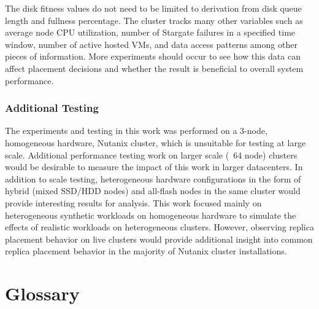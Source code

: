 \documentclass[12pt]{article}
\begin{document}
    The disk fitness values do not need to be limited to derivation from disk
    queue length and fullness percentage. The cluster tracks many other variables
    such as average node CPU utilization, number of Stargate failures in a
    specified time window, number of active hosted VMs, and data access patterns
    among other pieces of information. More experiments should occur to see how
    this data can affect placement decisions and whether the result is
    beneficial to overall system performance.
    
    \subsubsection{Additional Testing}

    The experiments and testing in this work was performed on a 3-node,
    homogeneous hardware, Nutanix cluster, which is unsuitable for testing at
    large scale. Additional performance testing work on larger scale (~64 node)
    clusters would be desirable to measure the impact of this work in larger
    datacenters. In addition to scale testing, heterogeneous hardware
    configurations in the form of hybrid (mixed SSD/HDD nodes) and all-flash
    nodes in the same cluster would provide interesting results for analysis.
    This work focused mainly on heterogeneous synthetic workloads on
    homogeneous hardware to simulate the effects of realistic workloads on
    heterogeneous clusters. However, observing replica placement behavior on
    live clusters would provide additional insight into common replica
    placement behavior in the majority of Nutanix cluster installations.


\newpage
\section*{Glossary}
\thispagestyle{empty}
\end{document}
